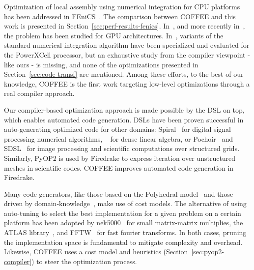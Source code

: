 \documentclass[conference]{IEEEtran}
\begin{document}
Optimization of local assembly using numerical integration for CPU platforms has been addressed in FEniCS~\cite{quadrature1}. The comparison between COFFEE and this work is presented in Section~\ref{sec:perf-results-fenics}. In~\cite{Markall20101815}, and more recently in~\cite{petsc-integration-gpu}, the problem has been studied for GPU architectures. In~\cite{assembly-opencl}, variants of the standard numerical integration algorithm have been specialized and evaluated for the PowerXCell processor, but an exhaustive study from the compiler viewpoint - like ours - is missing, and none of the optimizations presented in Section~\ref{sec:code-transf} are mentioned. Among these efforts, to the best of our knowledge, COFFEE is the first work targeting low-level optimizations through a real compiler approach.

Our compiler-based optimization approach is made possible by the DSL on top, which enables automated code generation. DSLs have been proven successful in auto-generating optimized code for other domains: Spiral~\cite{Pueschel:05} for digital signal processing numerical algorithms, ~\cite{Spampinato:14} for dense linear algebra, or Pochoir~\cite{pochoir} and SDSL~\cite{stencil-compiler} for image processing and scientific computations over structured grids. Similarly, PyOP2 is used by Firedrake to express iteration over unstructured meshes in scientific codes. COFFEE improves automated code generation in Firedrake.

Many code generators, like those based on the Polyhedral model~\cite{PLUTO} and those driven by domain-knowledge~\cite{modeldriven}, make use of cost models. The alternative of using auto-tuning to select the best implementation for a given problem on a certain platform has been adopted by nek5000~\cite{nek5000} for small matrix-matrix multiplies, the ATLAS library~\cite{ATLAS}, and FFTW~\cite{FFTW} for fast fourier transforms. In both cases, pruning the implementation space is fundamental to mitigate complexity and overhead. Likewise, COFFEE uses a cost model and heuristics (Section~\ref{sec:pyop2-compiler}) to steer the optimization process. 


\end{document}
